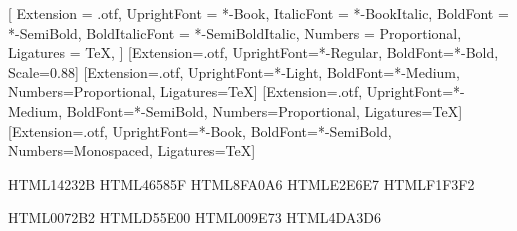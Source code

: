 
\usepackage{fontspec}
\usepackage{unicode-math}
\setsansfont{FiraSans}[
  Extension      = .otf,
  UprightFont    = *-Book,
  ItalicFont     = *-BookItalic,
  BoldFont       = *-SemiBold,
  BoldItalicFont = *-SemiBoldItalic,
  Numbers        = Proportional,
  Ligatures      = TeX,
]
\setmonofont{FiraMono}[Extension=.otf, UprightFont=*-Regular, BoldFont=*-Bold, Scale=0.88]
\renewcommand{\familydefault}{\sfdefault}
\newfontfamily{}[Extension=.otf, UprightFont=*-Light,
  BoldFont=*-Medium, Numbers=Proportional, Ligatures=TeX]
\newfontfamily{}[Extension=.otf, UprightFont=*-Medium,
  BoldFont=*-SemiBold, Numbers=Proportional, Ligatures=TeX]
\newfontfamily{}[Extension=.otf, UprightFont=*-Book,
  BoldFont=*-SemiBold, Numbers=Monospaced, Ligatures=TeX]

\definecolor{ink}    {HTML}{14232B}   %
\definecolor{ink2}   {HTML}{46585F}   %
\definecolor{muted}  {HTML}{8FA0A6}   %
\definecolor{rule}   {HTML}{E2E6E7}   %
\definecolor{wash}   {HTML}{F1F3F2}   %

\definecolor{accent} {HTML}{0072B2}   %
\definecolor{warm}   {HTML}{D55E00}   %
\definecolor{teal}   {HTML}{009E73}   %
\definecolor{onink}  {HTML}{4DA3D6}   %

